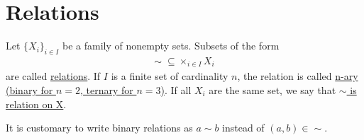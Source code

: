 \section{Relations}\label{sec:relations}

\begin{definition}\label{def:relation}
  Let $\{ X_i \}_{i \in I}$ be a family of nonempty sets.
  Subsets of the form
  \begin{align*}
    \sim\; \subseteq \times_{i \in I} X_i
  \end{align*}
  are called \ul{relations}. If $I$ is a finite set of cardinality $n$, the relation is called \ul{n-ary (binary for $n = 2$, ternary for $n = 3$)}. If all $X_i$ are the same set, we say that \ul{$\sim$ is relation on X}.

  It is customary to write binary relations as $a \sim b$ instead of $(a, b) \in \sim$.
\end{definition}

